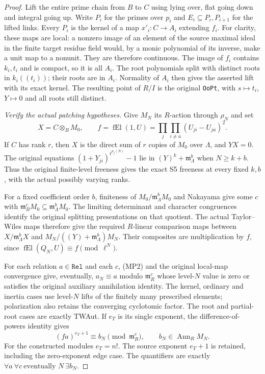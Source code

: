 \begin{proof}
Lift the entire prime chain from $B$ to $C$ using lying over, flat going
down and integral going up.  Write $P_i$ for the primes over $p_i$ and
$E_i\subseteq P_i,P_{i+1}$ for the lifted links.  Every $P_i$ is the
kernel of a map $x'_i:C\to A_i$ extending $f_i$.  For clarity, these
maps are local: a nonzero image of an element of the source maximal
ideal in the finite target residue field would, by a monic polynomial
of its inverse, make a unit map to a nonunit.  They are therefore
continuous.  The image of $f_i$ contains $k_i,t_i$ and is compact,
so it is all $A_i$.  The root polynomials split with distinct roots in
$k_i((t_i))$; their roots are in $A_i$.  Normality of $A_i$ then gives
the asserted lift with its exact kernel.  The resulting point of $R/I$
is the original \texttt{OoPt}, with $s\mapsto t_i$, $Y\mapsto0$ and
all roots still distinct.

\emph{Verify the actual patching hypotheses.}
Give $M_N$ its $R$-action through $\rho_N$ and set
\[
 X=C\otimes_BM_0,\qquad
 f=\operatorname{fEl}(1,U)=
                 \prod_j\prod_{i\ne a}(U_{ji}-U_{ja})^2.    \tag{MP8}
\]
If $C$ has rank $r$, then $X$ is the direct sum of $r$ copies of $M_0$
over $\Lambda$, and $YX=0$.  The original equations
$(1+Y_{ji})^{\ell^{a_j(N)}}-1$ lie in
$(Y)^k+\mathfrak m_\Lambda^b$ when $N\ge k+b$.  Thus the original
finite-level freeness gives the exact S5 freeness at every fixed
$k,b$, with the actual possibly varying ranks.

For a fixed coefficient order $b$, finiteness of
$M_0/\mathfrak m_\Lambda^bM_0$ and Nakayama give some $c$ with
$\mathfrak m_B^cM_0\subseteq\mathfrak m_\Lambda^bM_0$.
The limiting determinant and character congruences identify the
original splitting presentations on that quotient.  The actual
Taylor--Wiles maps therefore give the required $R$-linear comparison
maps between $X/\mathfrak m_\Lambda^bX$ and
$M_N/((Y)+\mathfrak m_\Lambda^b)M_N$.
Their composites are multiplication by $f$, since
$\operatorname{fEl}(Q_N,U)\equiv f\pmod{\ell^N}$.

For each relation $a\in\texttt{Rel}$ and each $c$, (MP2) and the
original local-map convergence give, eventually, $a_N\equiv a$
modulo $\mathfrak m_R^c$ whose level-$N$ value is zero or satisfies
the original auxiliary annihilation identity.  The kernel, ordinary
and inertia cases use level-$N$ lifts of the finitely many prescribed
elements; polarization also retains the converging cyclotomic factor.
The root and partial-root cases are exactly TWAut.
If $e_T$ is its single exponent, the difference-of-powers identity gives
\[
 (fa)^{e_T+1}\equiv b_N\pmod{\mathfrak m_R^c},
                   \qquad b_N\in\operatorname{Ann}_RM_N.     \tag{MP9}
\]
For the constructed modules $e_T=n!$.  The source exponent $e_T+1$
is retained, including the zero-exponent edge case.  The quantifiers
are exactly $\forall a\ \forall c\ \text{eventually }N\ \exists b_N$.


\end{proof}
